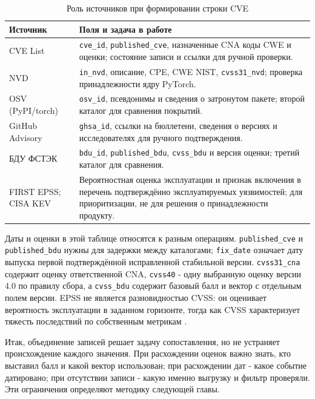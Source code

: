 \documentclass[12pt,a4paper]{report}
\begin{document}
\begin{table}[htbp]
\centering\small
\caption{Роль источников при формировании строки CVE}
\begin{tabularx}{\textwidth}{|P{2.6cm}|Y|}
\hline
{}
Источник & Поля и задача в работе \\
\hline
CVE List & \texttt{cve\_id}, \texttt{published\_cve}, назначенные CNA коды CWE и оценки; состояние записи и ссылки для ручной проверки. \\
\hline
NVD & \texttt{in\_nvd}, описание, CPE, CWE NIST, \texttt{cvss31\_nvd}; проверка принадлежности ядру PyTorch. \\
\hline
OSV (PyPI/torch) & \texttt{osv\_id}, псевдонимы и сведения о затронутом пакете; второй каталог для сравнения покрытий. \\
\hline
GitHub Advisory & \texttt{ghsa\_id}, ссылки на бюллетени, сведения о версиях и исследователях для ручного подтверждения. \\
\hline
БДУ ФСТЭК & \texttt{bdu\_id}, \texttt{published\_bdu}, \texttt{cvss\_bdu} и версия оценки; третий каталог для сравнения. \\
\hline
FIRST EPSS; CISA KEV & Вероятностная оценка эксплуатации и признак включения в перечень подтверждённо эксплуатируемых уязвимостей; для приоритизации, не для решения о принадлежности продукту. \\
\hline
\end{tabularx}
\end{table}

Даты и оценки в этой таблице относятся к разным операциям. \texttt{published\_cve} и \texttt{published\_bdu} нужны для задержки между каталогами; \texttt{fix\_date} означает дату выпуска первой подтверждённой исправленной стабильной версии. \texttt{cvss31\_cna} содержит оценку ответственной CNA, \texttt{cvss40} - одну выбранную оценку версии 4.0 по правилу сбора, а \texttt{cvss\_bdu} содержит базовый балл и вектор с отдельным полем версии. EPSS не является разновидностью CVSS: он оценивает вероятность эксплуатации в заданном горизонте, тогда как CVSS характеризует тяжесть последствий по собственным метрикам \cite{cveschema,epss}.

Итак, объединение записей решает задачу сопоставления, но не устраняет происхождение каждого значения. При расхождении оценок важно знать, кто выставил балл и какой вектор использован; при расхождении дат - какое событие датировано; при отсутствии записи - какую именно выгрузку и фильтр проверяли. Эти ограничения определяют методику следующей главы.
\end{document}
